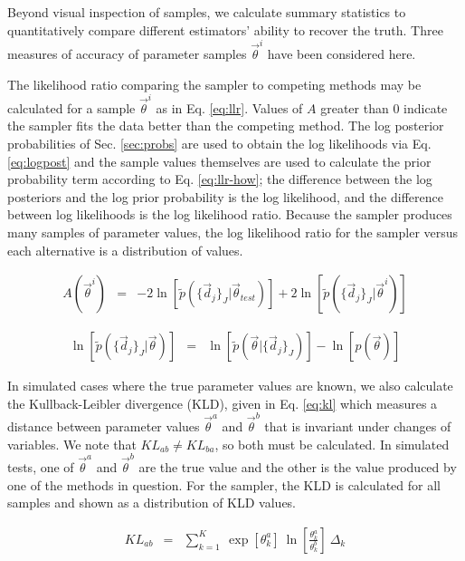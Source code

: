 \documentclass[preprint]{aastex}
\begin{document}
Beyond visual inspection of samples, we calculate summary statistics to 
quantitatively compare different estimators' ability to recover the truth.  
Three measures of accuracy of parameter samples $\vec{\theta}^{i}$  have been 
considered here.  

The likelihood ratio comparing the sampler to competing methods may be 
calculated for a sample $\vec{\theta}^{i}$ as in Eq. \ref{eq:llr}.  Values of 
$A$ greater than 0 indicate the sampler fits the data better than the competing 
method.  The log posterior probabilities of Sec. \ref{sec:probs} are used to 
obtain the log likelihoods via Eq. \ref{eq:logpost} and the sample values 
themselves are used to calculate the prior probability term according to Eq. 
\ref{eq:llr-how}; the difference between the log posteriors and the log prior 
probability is the log likelihood, and the difference between log likelihoods 
is the log likelihood ratio.  Because the sampler produces many samples of 
parameter values, the log likelihood ratio for the sampler versus each 
alternative is a distribution of values.

\begin{eqnarray}
\label{eq:llr}
A(\vec{\theta}^{i}) &=& 
-2\ln[\tilde{p}(\{\vec{d}_{j}\}_{J}|\vec{\theta}_{test})]+2\ln[\tilde{p}(\{\vec{
d}_{j}\}_{J}|\vec{\theta}^{i})]
\end{eqnarray}

\begin{eqnarray}
\label{eq:llr-how}
\ln[\tilde{p}(\{\vec{d}_{j}\}_{J}|\vec{\theta})] &=& 
\ln[\tilde{p}(\vec{\theta}|\{\vec{d}_{j}\}_{J})]-\ln[p(\vec{\theta})]
\end{eqnarray}

In simulated cases where the true parameter values are known, we also calculate 
the Kullback-Leibler divergence (KLD), given in Eq. \ref{eq:kl} which measures 
a distance between parameter values $\vec{\theta}^{a}$ and $\vec{\theta}^{b}$ 
that is invariant under changes of variables.  We note that $KL_{ab}\neq 
KL_{ba}$, so both must be calculated.  In simulated tests, one of 
$\vec{\theta}^{a}$ and $\vec{\theta}^{b}$ are the true value and the other is 
the value produced by one of the methods in question.  For the sampler, the KLD 
is calculated for all samples and shown as a distribution of KLD values.

\begin{eqnarray}
\label{eq:kl}
KL_{ab} &=& \sum_{k=1}^{K}\ \exp[\theta_{k}^{a}]\ 
\ln\left[\frac{\theta_{k}^{a}}{\theta_{k}^{b}}\right]\ \Delta_{k}
\end{eqnarray}
\end{document}
